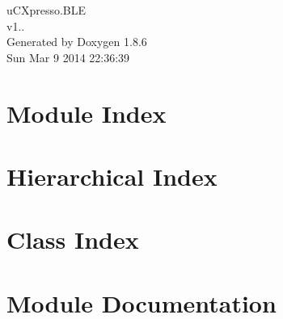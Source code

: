 \documentclass[twoside]{book}
\newcommand{\clearemptydoublepage}{%
  \newpage{\pagestyle{empty}\cleardoublepage}%
}
\begin{document}
\hypersetup{pageanchor=false}
\begin{titlepage}
\vspace*{7cm}
\begin{center}%
{\Large u\-C\-Xpresso.\-B\-L\-E \\[1ex]\large v1.. }\\
\vspace*{1cm}
{\large Generated by Doxygen 1.8.6}\\
\vspace*{0.5cm}
{\small Sun Mar 9 2014 22:36:39}\\
\end{center}
\end{titlepage}
\clearemptydoublepage
\tableofcontents
\clearemptydoublepage
{}
\hypersetup{pageanchor=true}

\chapter{Module Index}

\chapter{Hierarchical Index}

\chapter{Class Index}

\chapter{Module Documentation}



\end{document}
